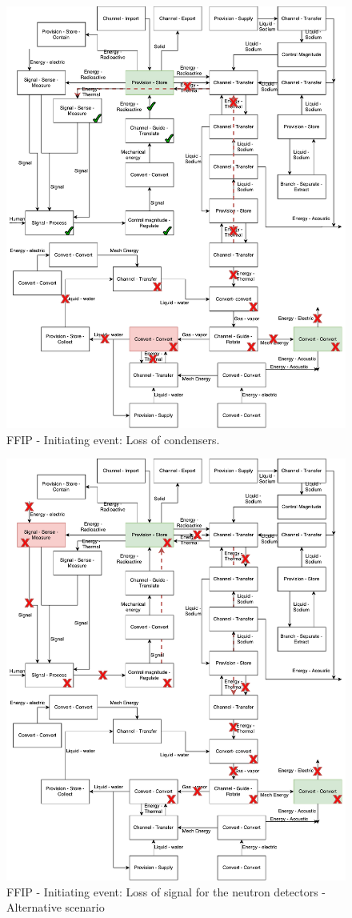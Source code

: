 \begin{figure}[t]
\centering
\includegraphics[scale=.55]{fig0d/FFIP_3}
\caption{FFIP - Initiating event: Loss of condensers.}
\label{fig:ffip3}
\end{figure}

\begin{figure}[t]
\centering
\includegraphics[scale=.55]{fig0d/FFIP_4}
\caption{FFIP - Initiating event: Loss of signal for the neutron detectors - Alternative scenario}
\label{fig:ffip4}
\end{figure}


\

